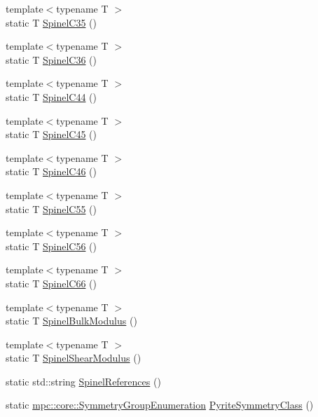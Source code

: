\begin{DoxyCompactItemize}
\item 
{\footnotesize template$<$typename T $>$ }\\static T \mbox{\hyperlink{namespacempc_1_1data_a08aa2ea2c9ed8d97d847ff986f6a7ed3}{Spinel\+C35}} ()
\item 
{\footnotesize template$<$typename T $>$ }\\static T \mbox{\hyperlink{namespacempc_1_1data_aaa2351be5ef7d1eca32fbf032fdab93c}{Spinel\+C36}} ()
\item 
{\footnotesize template$<$typename T $>$ }\\static T \mbox{\hyperlink{namespacempc_1_1data_a28b739ccb8e5a5d430c93da8e0c27a29}{Spinel\+C44}} ()
\item 
{\footnotesize template$<$typename T $>$ }\\static T \mbox{\hyperlink{namespacempc_1_1data_acbb8600aaac4b04368f02409df1a701b}{Spinel\+C45}} ()
\item 
{\footnotesize template$<$typename T $>$ }\\static T \mbox{\hyperlink{namespacempc_1_1data_a100e923e0bd8293bb81fecdedd9bb1e4}{Spinel\+C46}} ()
\item 
{\footnotesize template$<$typename T $>$ }\\static T \mbox{\hyperlink{namespacempc_1_1data_acf1f5d1fc2c2031908152bdabbb81f78}{Spinel\+C55}} ()
\item 
{\footnotesize template$<$typename T $>$ }\\static T \mbox{\hyperlink{namespacempc_1_1data_acc7105a060f78acd37bbc0fc200ef65e}{Spinel\+C56}} ()
\item 
{\footnotesize template$<$typename T $>$ }\\static T \mbox{\hyperlink{namespacempc_1_1data_afd4bcae5d47ca7616f5b24d47a0fbe58}{Spinel\+C66}} ()
\item 
{\footnotesize template$<$typename T $>$ }\\static T \mbox{\hyperlink{namespacempc_1_1data_a73dd9dbc34446f35dd74f0fdff365a2e}{Spinel\+Bulk\+Modulus}} ()
\item 
{\footnotesize template$<$typename T $>$ }\\static T \mbox{\hyperlink{namespacempc_1_1data_aabedfbfc2ba1f2070fbc174a010f34af}{Spinel\+Shear\+Modulus}} ()
\item 
static std\+::string \mbox{\hyperlink{namespacempc_1_1data_a61810e8bf3f43392340d3c346f7a9298}{Spinel\+References}} ()
\item 
static \mbox{\hyperlink{namespacempc_1_1core_a9d979684062547055a0ef5c13077bad8}{mpc\+::core\+::\+Symmetry\+Group\+Enumeration}} \mbox{\hyperlink{namespacempc_1_1data_a3bb7d5d250c8c79d1dfbcc8bf760da9b}{Pyrite\+Symmetry\+Class}} ()

\end{DoxyCompactItemize}
